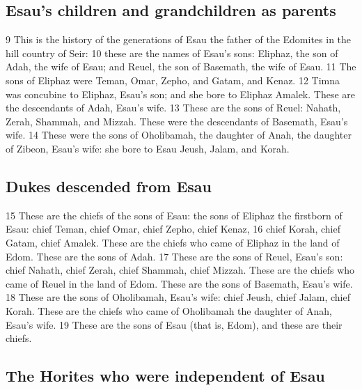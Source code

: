\hypertarget{esaus-children-and-grandchildren-as-parents}{%
\subsection{Esau's children and grandchildren as
parents}\label{esaus-children-and-grandchildren-as-parents}}

{9} This is the history of the generations of Esau the father of the
Edomites in the hill country of Seir: {10} these are the names of Esau's
sons: Eliphaz, the son of Adah, the wife of Esau; and Reuel, the son of
Basemath, the wife of Esau. {11} The sons of Eliphaz were Teman, Omar,
Zepho, and Gatam, and Kenaz. {12} Timna was concubine to Eliphaz, Esau's
son; and she bore to Eliphaz Amalek. These are the descendants of Adah,
Esau's wife. {13} These are the sons of Reuel: Nahath, Zerah, Shammah,
and Mizzah. These were the descendants of Basemath, Esau's wife. {14}
These were the sons of Oholibamah, the daughter of Anah, the daughter of
Zibeon, Esau's wife: she bore to Esau Jeush, Jalam, and Korah.

\hypertarget{dukes-descended-from-esau}{%
\subsection{Dukes descended from Esau}\label{dukes-descended-from-esau}}

{15} These are the chiefs of the sons of Esau: the sons of Eliphaz the
firstborn of Esau: chief Teman, chief Omar, chief Zepho, chief Kenaz,
{16} chief Korah, chief Gatam, chief Amalek. These are the chiefs who
came of Eliphaz in the land of Edom. These are the sons of Adah. {17}
These are the sons of Reuel, Esau's son: chief Nahath, chief Zerah,
chief Shammah, chief Mizzah. These are the chiefs who came of Reuel in
the land of Edom. These are the sons of Basemath, Esau's wife. {18}
These are the sons of Oholibamah, Esau's wife: chief Jeush, chief Jalam,
chief Korah. These are the chiefs who came of Oholibamah the daughter of
Anah, Esau's wife. {19} These are the sons of Esau (that is, Edom), and
these are their chiefs.

\hypertarget{the-horites-who-were-independent-of-esau}{%
\subsection{The Horites who were independent of
Esau}\label{the-horites-who-were-independent-of-esau}}

